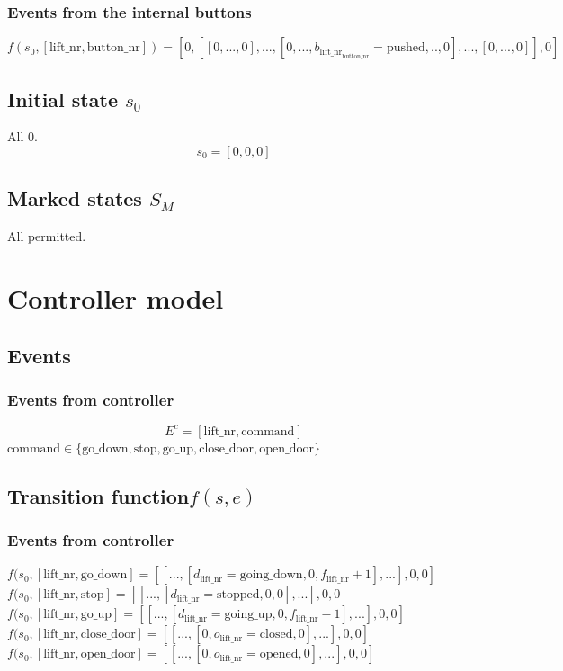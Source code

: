 \documentclass[12pt]{article}
\begin{document}
\subsubsection{Events from the internal buttons}
\[
  f(s_0,[\text{lift\_nr},\text{button\_nr}]) =
  [0,[[0,...,0],...,[0,...,b_{\text{lift\_nr}_\text{button\_nr}}=\text{pushed},..,0],...,[0,...,0]],0]
\]


\subsection{Initial state \(s_0\)}
All 0.
\[
  s_0 = [0,0,0]
\]




\subsection{Marked states \(S_M\)}
All permitted.

\section{Controller model}

\subsection{Events}
\subsubsection{Events from controller}
\[ E^c = [\text{lift\_nr}, \text{command}] \]
\(\text{command} \in \{\text{go\_down},\text{stop},\text{go\_up},\text{close\_door},\text{open\_door}\}\)

\subsection{Transition function\(f(s,e)\)}



\subsubsection{Events from controller}
\(
  f(s_0,[\text{lift\_nr},\text{go\_down}] =
  [[...,[d_\text{lift\_nr}=\text{going\_down},0,f_\text{lift\_nr}+1],...],0,0]
\)\\
\(
  f(s_0,[\text{lift\_nr},\text{stop}] =
  [[...,[d_\text{lift\_nr}=\text{stopped},0,0],...],0,0]
\)\\
\(
  f(s_0,[\text{lift\_nr},\text{go\_up}] =
  [[...,[d_\text{lift\_nr}=\text{going\_up},0,f_\text{lift\_nr}-1],...],0,0]
\)\\
\(
  f(s_0,[\text{lift\_nr},\text{close\_door}] =
  [[...,[0,o_\text{lift\_nr}=\text{closed},0],...],0,0]
\)\\
\(
  f(s_0,[\text{lift\_nr},\text{open\_door}] =
  [[...,[0,o_\text{lift\_nr}=\text{opened},0],...],0,0]
\)
\end{document}

